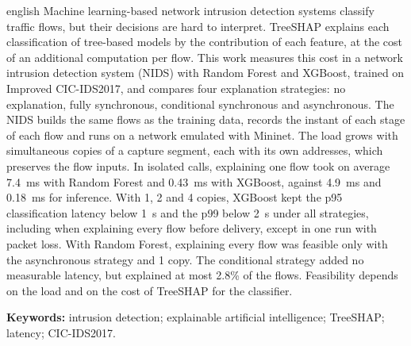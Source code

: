 \documentclass[
  12pt,
  oneside,
  a4paper,
  chapter=TITLE,
  sumario=tradicional,
  english,
  brazil
]{abntex2}
\begin{document}
\begin{resumo}[Abstract]
  \begin{otherlanguage*}{english}
    Machine learning-based network intrusion detection systems classify traffic flows, but their
    decisions are hard to interpret. TreeSHAP explains each classification of tree-based models by the
    contribution of each feature, at the cost of an additional computation per flow. This work measures
    this cost in a network intrusion detection system (NIDS) with Random Forest and XGBoost, trained on
    Improved CIC-IDS2017, and compares four explanation strategies: no explanation, fully synchronous,
    conditional synchronous and asynchronous. The NIDS builds the same flows as the training data,
    records the instant of each stage of each flow and runs on a network emulated with Mininet. The load
    grows with simultaneous copies of a capture segment, each with its own addresses, which preserves
    the flow inputs. In isolated calls, explaining one flow took on average 7.4~ms with Random Forest
    and 0.43~ms with XGBoost, against 4.9~ms and 0.18~ms for inference. With 1, 2 and 4 copies, XGBoost
    kept the p95 classification latency below 1~s and the p99 below 2~s under all strategies, including
    when explaining every flow before delivery, except in one run with packet loss. With Random Forest,
    explaining every flow was feasible only with the asynchronous strategy and 1 copy. The conditional
    strategy added no measurable latency, but explained at most 2.8\% of the flows. Feasibility depends
    on the load and on the cost of TreeSHAP for the classifier.

    \vspace{\onelineskip}
    \noindent\textbf{Keywords:} intrusion detection; explainable artificial intelligence;
    TreeSHAP; latency; CIC-IDS2017.
  \end{otherlanguage*}
\end{resumo}

\listoffigures*
\cleardoublepage

\listoftables*
\cleardoublepage
\end{document}
